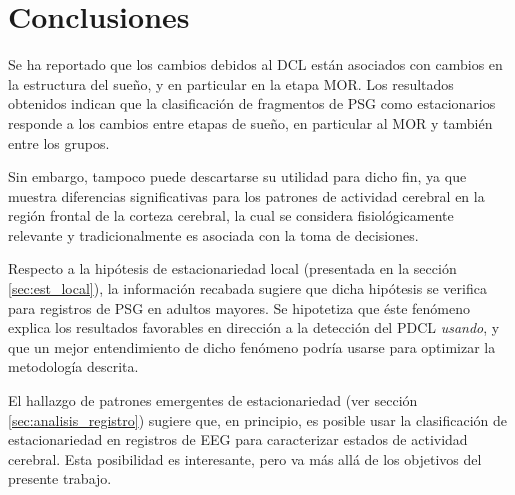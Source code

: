 \documentclass[12pt,letterpaper]{book}
\begin{document}

\section{Conclusiones}


Se ha reportado que los cambios debidos al DCL están asociados con cambios en la estructura del sueño, y en particular en la etapa MOR.
%
Los resultados obtenidos indican que la clasificación de fragmentos de PSG como estacionarios responde a los cambios entre etapas de sueño, en particular al MOR y también entre los grupos.

Sin embargo, tampoco puede descartarse su utilidad para dicho fin, ya que muestra diferencias significativas para los patrones de actividad cerebral en la región frontal de la corteza cerebral, la cual se considera fisiológicamente relevante y tradicionalmente es asociada con la toma de decisiones.

Respecto a la hipótesis de estacionariedad local (presentada en la sección \ref{sec:est_local}), la información recabada sugiere que dicha hipótesis se verifica para registros de PSG en adultos mayores.
%
Se hipotetiza que éste fenómeno explica los resultados {favorables} en dirección a la detección del PDCL \textit{usando}, y que un mejor entendimiento de dicho fenómeno podría usarse para optimizar la metodología descrita.

El hallazgo de patrones emergentes de estacionariedad (ver sección \ref{sec:analisis_registro}) sugiere que, en principio, es posible usar la clasificación de estacionariedad en registros de EEG para caracterizar estados de actividad cerebral. 
%
Esta posibilidad es interesante, pero va más allá de los objetivos del presente trabajo.

\end{document}
